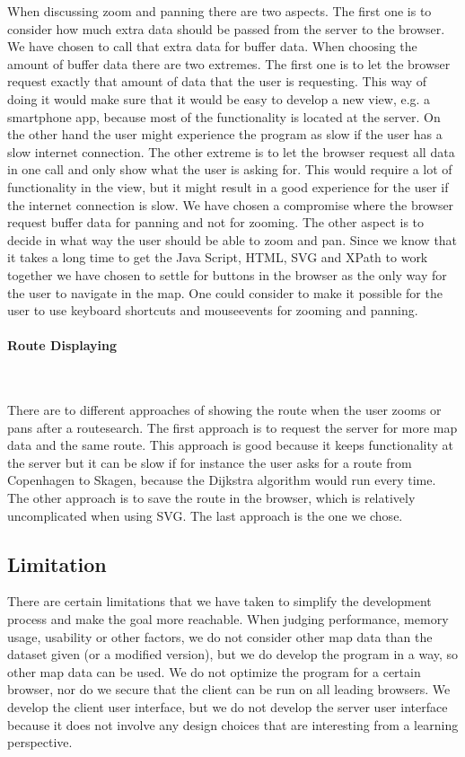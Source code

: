\documentclass[a4paper,10pt,titlepage]{article}
\begin{document}
When discussing zoom and panning there are two aspects. The first one is to consider how much extra data should be passed from the server to the browser. We have chosen to call that extra data for buffer data. When choosing the amount of buffer data there are two extremes. The first one is to let the browser request exactly that amount of data that the user is requesting. This way of doing it would make sure that it would be easy to develop a new view, e.g. a smartphone app, because most of the functionality is located at the server. On the other hand the user might experience the program as slow if the user has a slow internet connection. The other extreme is to let the browser request all data in one call and only show what the user is asking for. This would require a lot of functionality in the view, but it might result in a good experience for the user if the internet connection is slow. We have chosen a compromise where the browser request buffer data for panning and not for zooming.
The other aspect is to decide in what way the user should be able to zoom and pan. Since we know that it takes a long time to get the Java Script, HTML, SVG and XPath to work together we have chosen to settle for buttons in the browser as the only way for the user to navigate in the map. One could consider to make it possible for the user to use keyboard shortcuts and mouseevents for zooming and panning. 

\paragraph{Route Displaying}\mbox{}\

There are to different approaches of showing the route when the user zooms or pans after a routesearch. The first approach is to request the server for more map data and the same route. This approach is good because it keeps functionality at the server but it can be slow if for instance the user asks for a route from Copenhagen to Skagen, because the Dijkstra algorithm would run every time. The other approach is to save the route in the browser, which is relatively uncomplicated when using SVG. The last approach is the one we chose.	

		\subsection{Limitation}	
		There are certain limitations that we have taken to simplify the development process and make the goal more reachable. When judging performance, memory usage, usability or other factors, we do not consider other map data than the dataset given (or a modified version), but we do develop the program in a way, so other map data can be used. We do not optimize the program for a certain browser, nor do we secure that the client can be run on all leading browsers. We develop the client user interface, but we do not develop the server user interface because it does not involve any design choices that are interesting from a learning perspective.
					
\end{document}

